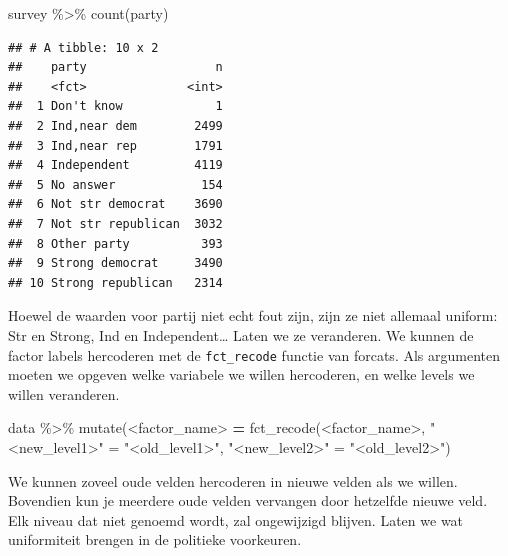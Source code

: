 \documentclass[]{tufte-book}
\newenvironment{Shaded}{}{}
\newcommand{\ErrorTok}[1]{\textcolor[rgb]{1.00,0.00,0.00}{\textbf{#1}}}
\newcommand{\FunctionTok}[1]{\textcolor[rgb]{0.02,0.16,0.49}{#1}}
\newcommand{\NormalTok}[1]{#1}
\newcommand{\OtherTok}[1]{\textcolor[rgb]{0.00,0.44,0.13}{#1}}
\newcommand{\SpecialCharTok}[1]{\textcolor[rgb]{0.25,0.44,0.63}{#1}}
\newcommand{\StringTok}[1]{\textcolor[rgb]{0.25,0.44,0.63}{#1}}
\begin{document}
\begin{Shaded}
\begin{Highlighting}[]
\NormalTok{survey }\SpecialCharTok{\%\textgreater{}\%}
  \FunctionTok{count}\NormalTok{(party)}
\end{Highlighting}
\end{Shaded}

\begin{verbatim}
## # A tibble: 10 x 2
##    party                  n
##    <fct>              <int>
##  1 Don't know             1
##  2 Ind,near dem        2499
##  3 Ind,near rep        1791
##  4 Independent         4119
##  5 No answer            154
##  6 Not str democrat    3690
##  7 Not str republican  3032
##  8 Other party          393
##  9 Strong democrat     3490
## 10 Strong republican   2314
\end{verbatim}

Hoewel de waarden voor partij niet echt fout zijn, zijn ze niet allemaal uniform: Str en Strong, Ind en Independent\ldots{} Laten we ze veranderen. We kunnen de factor labels hercoderen met de \texttt{fct\_recode} functie van forcats. Als argumenten moeten we opgeven welke variabele we willen hercoderen, en welke levels we willen veranderen.

\begin{Shaded}
\begin{Highlighting}[]
\NormalTok{data }\SpecialCharTok{\%\textgreater{}\%}
    \FunctionTok{mutate}\NormalTok{(}\SpecialCharTok{\textless{}}\NormalTok{factor\_name}\SpecialCharTok{\textgreater{}} \ErrorTok{=} \FunctionTok{fct\_recode}\NormalTok{(}\SpecialCharTok{\textless{}}\NormalTok{factor\_name}\SpecialCharTok{\textgreater{}}\NormalTok{, }
                                      \StringTok{"\textless{}new\_level1\textgreater{}"} \OtherTok{=} \StringTok{"\textless{}old\_level1\textgreater{}"}\NormalTok{,}
                                      \StringTok{"\textless{}new\_level2\textgreater{}"} \OtherTok{=} \StringTok{"\textless{}old\_level2\textgreater{}"}\NormalTok{)}
\end{Highlighting}
\end{Shaded}

We kunnen zoveel oude velden hercoderen in nieuwe velden als we willen. Bovendien kun je meerdere oude velden vervangen door hetzelfde nieuwe veld. Elk niveau dat niet genoemd wordt, zal ongewijzigd blijven. Laten we wat uniformiteit brengen in de politieke voorkeuren.
\end{document}
